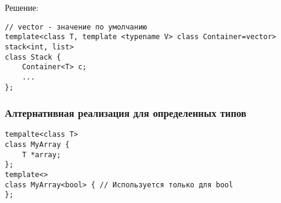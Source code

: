 Решение:

\begin{verbatim}
// vector - значение по умолчанию
template<class T, template <typename V> class Container=vector>
stack<int, list>
class Stack {
    Container<T> c;
    ...
};
\end{verbatim}

\subsubsection*{Алтернативная реализация для определенных типов}
\begin{verbatim}
tempalte<class T>
class MyArray {
    T *array;
};
template<>
class MyArray<bool> { // Используется только для bool
};
\end{verbatim}
